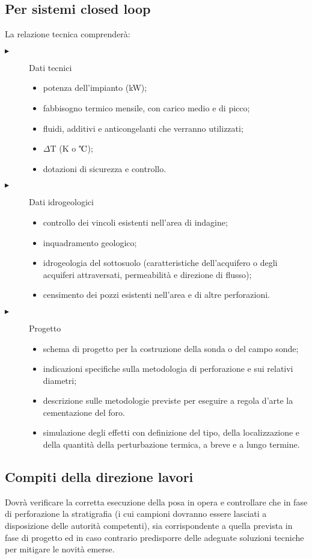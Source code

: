 \subsection{Per sistemi closed loop}
La relazione tecnica comprenderà:
\begin{description}
\item[$\blacktriangleright$] Dati tecnici
\begin{itemize}
\item potenza dell'impianto (kW);
\item fabbisogno termico mensile, con carico medio e di picco;
\item fluidi, additivi e anticongelanti che verranno utilizzati;
\item $\Delta \mathrm{T}$ (K o $\celsius$);
\item dotazioni di sicurezza e controllo.
\end{itemize}
\item[$\blacktriangleright$] Dati idrogeologici
\begin{itemize}
\item controllo dei vincoli esistenti nell'area di indagine;
\item inquadramento geologico;
\item idrogeologia del sottosuolo (caratteristiche dell'acquifero o degli acquiferi attraversati, permeabilità e direzione di flusso);
\item censimento dei pozzi esistenti nell'area e di altre perforazioni.
\end{itemize}
\item[$\blacktriangleright$] Progetto
\begin{itemize}
\item schema di progetto per la costruzione della sonda o del campo sonde;
\item indicazioni specifiche sulla metodologia di perforazione e sui relativi diametri;
\item descrizione sulle metodologie previste per eseguire a regola d'arte la cementazione del foro.
\item simulazione degli effetti con definizione del tipo, della localizzazione e della quantità della perturbazione termica, a breve e a lungo termine. 
\end{itemize}
\end{description}

\subsection{Compiti della direzione lavori}
Dovrà verificare la corretta esecuzione della posa in opera e controllare che in fase di perforazione la stratigrafia (i cui campioni dovranno essere lasciati a disposizione delle autorità competenti), sia corrispondente a quella prevista in fase di progetto ed in caso contrario predisporre delle adeguate soluzioni tecniche per mitigare le novità emerse.

